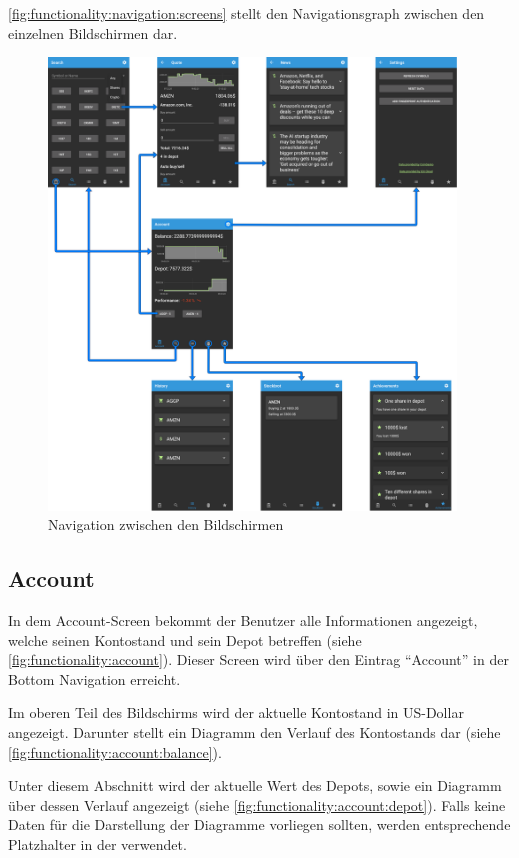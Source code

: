 \documentclass[a4paper]{article}
\begin{document}
\autoref{fig:functionality:navigation:screens} stellt den Navigationsgraph zwischen den einzelnen Bildschirmen dar.
\begin{figure}[H]
	\centering
	\includegraphics[height=12cm]{./images/navigation_screens/navigation_screens.png}
	\caption{Navigation zwischen den Bildschirmen}
	\label{fig:functionality:navigation:screens}
\end{figure}


\subsection{Account}
\label{subsec:functionality:account}
In dem Account-Screen bekommt der Benutzer alle Informationen angezeigt, welche seinen Kontostand und sein Depot betreffen (siehe \autoref{fig:functionality:account}). Dieser Screen wird über den Eintrag "`Account"' in der Bottom Navigation erreicht.

Im oberen Teil des Bildschirms wird der aktuelle Kontostand in US-Dollar angezeigt. Darunter stellt ein Diagramm den Verlauf des Kontostands dar (siehe \autoref{fig:functionality:account:balance}).
 
Unter diesem Abschnitt wird der aktuelle Wert des Depots, sowie ein Diagramm über dessen Verlauf angezeigt (siehe \autoref{fig:functionality:account:depot}).
Falls keine Daten für die Darstellung der Diagramme vorliegen sollten, werden entsprechende Platzhalter in der verwendet.
\end{document}
